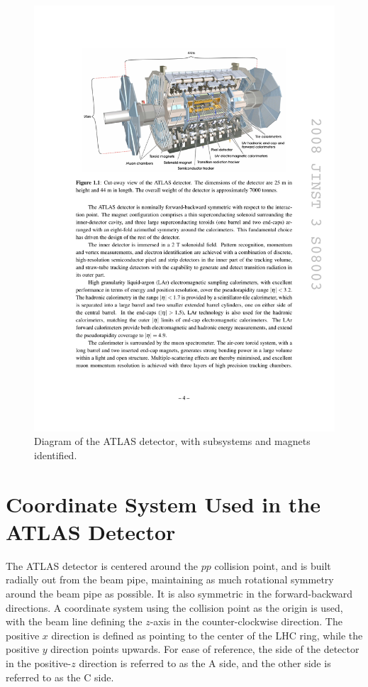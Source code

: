 \begin{centering}
\begin{figure}[bth]
\myfloatalign
\includegraphics[width=.90\linewidth]{figures/atlas/detector.pdf}
\caption{Diagram of the \ac{ATLAS} detector, with subsystems and magnets identified.}
\label{fig:detector}
\end{figure}
\end{centering}

\section{Coordinate System Used in the ATLAS Detector}
\label{sec:coords}

The \ac{ATLAS} detector is centered around the $pp$ collision point, and is built radially out from the beam pipe, maintaining as much rotational symmetry around the beam pipe as possible. It is also symmetric in the forward-backward directions. A coordinate system using the collision point as the origin is used, with the beam line defining the $z$-axis in the counter-clockwise direction. The positive $x$ direction is defined as pointing to the center of the \ac{LHC} ring, while the positive $y$ direction points upwards. For ease of reference, the side of the detector in the positive-$z$ direction is referred to as the A side, and the other side is referred to as the C side. 

